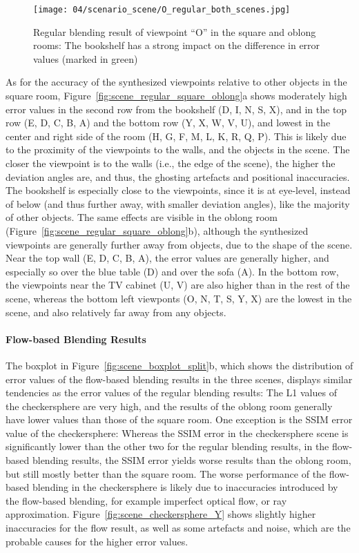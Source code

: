 \begin{figure}
		\centering
    \texttt{[image: 04/scenario\_scene/O\_regular\_both\_scenes.jpg]}
		\caption[Regular blending results of ``O'']{Regular blending result of viewpoint ``O'' in the square and oblong rooms: The bookshelf has a strong impact on the difference in error values (marked in green)}
		\label{fig:scene_O_regular}
\end{figure}

As for the accuracy of the synthesized viewpoints relative to other objects in the square room, Figure~\ref{fig:scene_regular_square_oblong}a shows 
moderately high error values in the second row from the bookshelf (D, I, N, S, X), and in the top row (E, D, C, B, A) and the bottom row (Y, X, W, V, U), and lowest in the center and right side of the room (H, G, F, M, L, K, R, Q, P). This is likely due to the proximity of the viewpoints to the walls, and the objects in the scene. The closer the viewpoint is to the walls (i.e., the edge of the scene), the higher the deviation angles are, and thus, the ghosting artefacts and positional inaccuracies. The bookshelf is especially close to the viewpoints, since it is at eye-level, instead of below (and thus further away, with smaller deviation angles), like the majority of other objects.
The same effects are visible in the oblong room (Figure~\ref{fig:scene_regular_square_oblong}b), although the synthesized viewpoints are generally further away from objects, due to the shape of the scene. Near the top wall (E, D, C, B, A), the error values are generally higher, and especially so over the blue table (D) and over the sofa (A). In the bottom row, the viewpoints near the TV cabinet (U, V) are also higher than in the rest of the scene, whereas the bottom left viewponts (O, N, T, S, Y, X) are the lowest in the scene, and also relatively far away from any objects.

\paragraph{Flow-based Blending Results}
The boxplot in Figure~\ref{fig:scene_boxplot_split}b, which shows the distribution of error values of the flow-based blending results in the three scenes, displays similar tendencies as the error values of the regular blending results: The L1 values of the checkersphere are very high, and the results of the oblong room generally have lower values than those of the square room. One exception is the SSIM error value of the checkersphere: Whereas the SSIM error in the checkersphere scene is significantly lower than the other two for the regular blending results, in the flow-based blending results, the SSIM error yields worse results than the oblong room, but still mostly better than the square room. The worse performance of the flow-based blending in the checkersphere is likely due to inaccuracies introduced by the flow-based blending, for example imperfect optical flow, or ray approximation. Figure~\ref{fig:scene_checkersphere_Y} shows slightly higher inaccuracies for the flow result, as well as some artefacts and noise, which are the probable causes for the higher error values.

